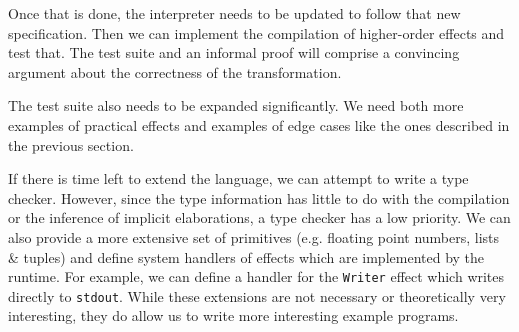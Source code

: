 \documentclass{article}
\begin{document}
Once that is done, the interpreter needs to be updated to follow that new specification. Then we can implement the compilation of higher-order effects and test that. The test suite and an informal proof will comprise a convincing argument about the correctness of the transformation.

The test suite also needs to be expanded significantly. We need both more examples of practical effects and examples of edge cases like the ones described in the previous section.

If there is time left to extend the language, we can attempt to write a type checker. However, since the type information has little to do with the compilation or the inference of implicit elaborations, a type checker has a low priority. We can also provide a more extensive set of primitives (e.g. floating point numbers, lists \& tuples) and define system handlers of effects which are implemented by the runtime. For example, we can define a handler for the \texttt{Writer} effect which writes directly to \texttt{stdout}. While these extensions are not necessary or theoretically very interesting, they do allow us to write more interesting example programs.

\printbibliography
\end{document}
